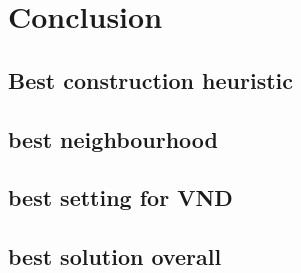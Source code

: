\documentclass[12pt,a4paper]{article}
\begin{document}
\section{Conclusion}

\subsection{Best construction heuristic}

\subsection{best neighbourhood}

\subsection{best setting for VND}

\subsection{best solution overall}
\end{document}
